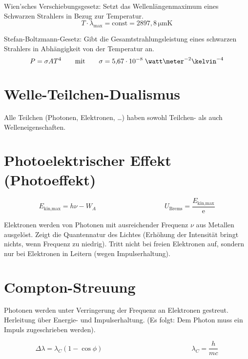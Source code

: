 \documentclass[a4paper,german,10pt,smallheadings]{scrartcl}
\begin{document}
Wien'sches Verschiebungsgesetz: Setzt das Wellenlängenmaximum eines Schwarzen Strahlers in Bezug zur Temperatur.
\begin{equation}
  T \cdot \lambda_\mathrm{max} = \mathrm{const} = 2897{,}8 \, \mathrm{\mu m \mathrm{K}}
\end{equation}

Stefan-Boltzmann-Gesetz: Gibt die Gesamtstrahlungsleistung eines schwarzen Strahlers in Abhängigkeit von der Temperatur an.
\begin{equation}
  P = \sigma A T^4 \qquad \text{mit} \qquad \sigma = 5{,}67 \cdot 10^{-8} \;\watt\meter^{-2}\kelvin^{-4}
\end{equation}

\newpage

\section{Welle-Teilchen-Dualismus}

Alle Teilchen (Photonen, Elektronen, \dots) haben sowohl Teilchen- als auch
Welleneigenschaften.

\section{Photoelektrischer Effekt (Photoeffekt)}
\begin{equation*}
  E_\text{kin,max} = h \nu - W_A
  \quad\quad\quad\qquad
  \quad\quad\quad\qquad
  U_\text{Brems} = \frac{E_\text{kin,max}}{\text{e}}
\end{equation*}

Elektronen werden von Photonen mit ausreichender Frequenz $\nu$ aus Metallen
ausgelöst. Zeigt die Quantennatur des Lichtes (Erhöhung der Intensität bringt
nichts, wenn Frequenz zu niedrig). Tritt nicht bei freien Elektronen auf,
sondern nur bei Elektronen in Leitern (wegen Impulserhaltung).

\section{Compton-Streuung}

Photonen werden unter Verringerung der Frequenz an Elektronen gestreut.
Herleitung über Energie- und Impulserhaltung. (Es folgt: Dem Photon muss ein
Impuls zugeschrieben werden).

\begin{equation*}
  \Delta \lambda = \lambda_C \left( 1 - \cos \phi \right)
  \quad\quad\quad\qquad
  \quad\quad\quad\qquad
  \quad\quad\quad
  \lambda_C = \frac{h}{mc}
\end{equation*}
\end{document}
